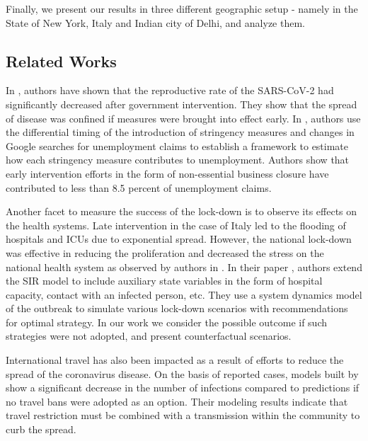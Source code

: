 \documentclass[final,authoryear,5p,times,twocolumn]{elsarticle}
\begin{document}
	Finally, we present our results in three different geographic setup - namely in the State of New York, Italy and Indian city of Delhi, and analyze them. 
	
	\subsection{Related Works}
	In \cite{Koh2020}, authors have shown that the reproductive rate of the SARS-CoV-2 had significantly decreased after government intervention. They show that the spread of disease was confined if measures were brought into effect early. In \cite{KP2020}, authors use the differential timing of the introduction of stringency measures and changes in Google searches for unemployment claims to establish a framework to estimate how each stringency measure contributes to unemployment. Authors show that early intervention efforts in the form of non-essential business closure have contributed to less than 8.5 percent of unemployment claims.
	
	Another facet to measure the success of the lock-down is to observe its effects on the health systems. Late intervention in the case of Italy led to the flooding of hospitals and ICUs due to exponential spread. However, the national lock-down was effective in reducing the proliferation and decreased the stress on the national health system as observed by authors in \cite{Supino2020}. In their paper \cite{IVEGA2020},  authors extend the SIR model to include auxiliary state variables in the form of hospital capacity, contact with an infected person, etc. They use a system dynamics model of the outbreak to simulate various lock-down scenarios with recommendations for optimal strategy. In our work we consider the possible outcome if such strategies were not adopted,  and present counterfactual scenarios.
	
	International travel has also been impacted as a result of efforts to reduce the spread of the coronavirus disease. On the basis of reported cases, models built by \cite{Chinazzi395} show a significant decrease in the number of infections compared to predictions if no travel bans were adopted as an option. Their modeling results indicate that travel restriction must be combined with a transmission within the community to curb the spread.
	
\end{document}
